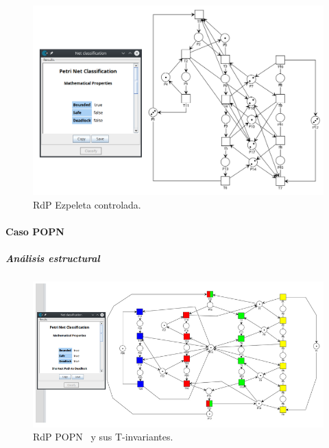 \begin{figure}[H]
	\centering
	\includegraphics[width=\textwidth]{Figures/algoritmo4/ezpeleta_deadlock_false.png}
	\caption{RdP Ezpeleta controlada.}
	\label{fig:Rdp-Ezpeleta-Contv4}
\end{figure}
\bigskip

\paragraph{Caso POPN}
\subparagraph{Análisis estructural}
\hfill

\begin{figure}[H]
	\centering
	\includegraphics[scale=0.7]{Figures/algoritmo4/popn_imag1.png}
	\caption[RdP POPN y sus T-invariantes.]{RdP POPN \footnotemark \ y sus T-invariantes.}
	\label{fig:Rdp-POPNv4}
\end{figure} 

